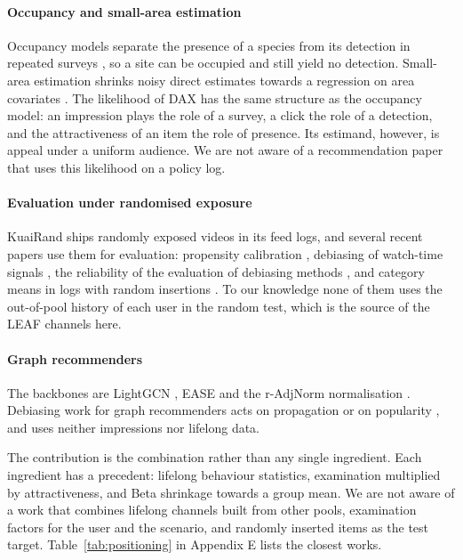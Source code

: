 \documentclass[preprint,12pt,authoryear]{elsarticle}
\begin{document}
\paragraph{Occupancy and small-area estimation} Occupancy models separate the presence of a species from its detection in repeated
surveys \citep{mackenzie2002occupancy}, so a site can be occupied and still yield no detection. Small-area estimation shrinks noisy
direct estimates towards a regression on area covariates \citep{fay1979smallarea}. The likelihood of DAX has the same structure as
the occupancy model: an impression plays the role of a survey, a click the role of a detection, and the attractiveness of an item
the role of presence. Its estimand, however, is appeal under a uniform audience. We are not aware of a recommendation paper that
uses this likelihood on a policy log.

\paragraph{Evaluation under randomised exposure} KuaiRand \citep{gao2022kuairand} ships randomly exposed videos in its feed logs, and
several recent papers use them for evaluation: propensity calibration \citep{hu2025uncertainty}, debiasing of watch-time signals
\citep{zhao2023d2co}, the reliability of the evaluation of debiasing methods \citep{wang2025debiasunreliable}, and category means in
logs with random insertions \citep{zhang2026categorymeans}. To our knowledge none of them uses the out-of-pool history of each user in
the random test, which is the source of the LEAF channels here.

\paragraph{Graph recommenders} The backbones are LightGCN \citep{he2020lightgcn}, EASE \citep{steck2019ease} and the r-AdjNorm
normalisation \citep{zhao2022radjnorm}. Debiasing work for graph recommenders acts on propagation or on popularity
\citep{kim2022navip,zhang2021pda}, and uses neither impressions nor lifelong data.

The contribution is the combination rather than any single ingredient. Each ingredient has a precedent: lifelong behaviour
statistics, examination multiplied by attractiveness, and Beta shrinkage towards a group mean. We are not aware of a work that
combines lifelong channels built from other pools, examination factors for the user and the scenario, and randomly inserted items as
the test target. Table~\ref{tab:positioning} in Appendix E lists the closest works.
\end{document}
